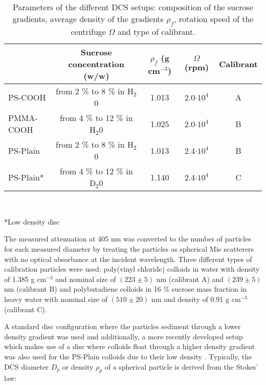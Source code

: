 \begin{table*}[]
\centering
\caption[Parameters of the different DCS setups.]{Parameters of the different DCS setups: composition of the sucrose gradients, average density of the gradients $\rho_f$, rotation speed of the centrifuge $\Omega$ and type of calibrant.}
\label{tab:DCSParameters}
\begin{tabular}{l|c|c|c|c|}
\cline{2-5}
\multicolumn{1}{c|}{}                         & Sucrose concentration (w/w)    & $\rho_f$ (g cm$^{-3}$) & $\Omega$ (rpm)  & Calibrant \\ \hline
\multicolumn{1}{|l|}{PS-COOH}    & from 2 \% to 8 \% in H$_2$0  & 1.013                  & 2.0$\cdot 10^4$                  & A         \\ \hline
\multicolumn{1}{|l|}{PMMA-COOH}  & from 4 \% to 12 \% in H$_2$0 & 1.025                  & 2.0$\cdot 10^4$                  & B         \\ \hline
\multicolumn{1}{|l|}{PS-Plain}      & from 2 \% to 8 \% in H$_2$0  & 1.013     & 2.4$\cdot 10^4$                  & B        \\ \hline
\multicolumn{1}{|l|}{PS-Plain*} & from 4 \% to 12 \% in D$_2$0 & 1.140     & 2.4$\cdot 10^4$                  & C         \\ \hline

\end{tabular}\\[0.3\baselineskip]
\begin{minipage}{15cm}
	\begin{raggedright}
	*\small{Low density disc}
	\end{raggedright}
\end{minipage}
\label{tab:composition}
\end{table*}

The measured attenuation at 405 nm was converted to the number of particles for each measured diameter by treating the particles as spherical Mie scatterers with no optical absorbance at the incident wavelength. Three different types of calibration particles were used: poly(vinyl chloride) colloids in water with density of 1.385 g cm$^{-3}$ and nominal size of $(223\pm5)$ nm (calibrant A) and $(239\pm5)$ nm (calibrant B) and polybutadiene colloids in 16 \% sucrose mass fraction in heavy water with nominal size of $(510\pm20)$ nm and density of 0.91 g cm$^{-3}$ (calibrant C). 

A standard disc configuration where the particles sediment through a lower density gradient was used and additionally, a more recently developed setup which makes use of a disc where colloids float through a higher density gradient was also used for the PS-Plain colloids due to their low density \citep{fitzpatrick_structure_1998}. Typically, the DCS diameter $D_p$ or density $\rho_p$ of a spherical particle is derived from the Stokes' law:

